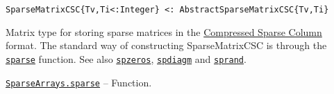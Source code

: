 \begin{adjustwidth}{2em}{0pt}


\begin{verbatim}
SparseMatrixCSC{Tv,Ti<:Integer} <: AbstractSparseMatrixCSC{Tv,Ti}
\end{verbatim}

Matrix type for storing sparse matrices in the \hyperlink{4286524230912717228}{Compressed Sparse Column} format. The standard way of constructing SparseMatrixCSC is through the \hyperlink{10167157011990389788}{\texttt{sparse}} function. See also \hyperlink{10306793690101482847}{\texttt{spzeros}}, \hyperlink{10407455986460913397}{\texttt{spdiagm}} and \hyperlink{10437881912081266792}{\texttt{sprand}}.



\end{adjustwidth}
\hypertarget{10167157011990389788}{} 
\hyperlink{10167157011990389788}{\texttt{SparseArrays.sparse}}  -- {Function.}

